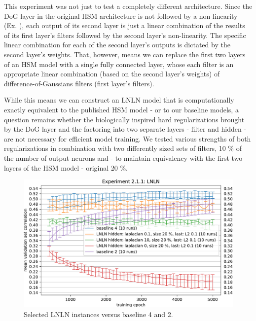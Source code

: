 This experiment was not just to test a completely different architecture. Since the DoG layer in the original HSM architecture is not followed by a non-linearity (Ex. ), each output of its second layer is just a linear combination of the results of its first layer’s filters followed by the second layer’s non-linearity. The specific linear combination for each of the second layer’s outputs is dictated by the second layer’s weights. That, however, means we can replace the first two layers of an HSM model with a single fully connected layer, whose each filter is an appropriate linear combination (based on the second layer’s weights) of difference-of-Gaussians filters (first layer’s filters). 

While this means we can construct an LNLN model that is computationally exactly equivalent to the published HSM model - or to our baseline models, a question remains whether the biologically inspired hard regularizations brought by the DoG layer and the factoring into two separate layers - filter and hidden - are not necessary for efficient model training. We tested various strengths of both regularizations in combination with two differently sized sets of filters, 10 \% of the number of output neurons and - to maintain equivalency with the first two layers of the HSM model - original 20 \%.

\begin{figure}[H]
    \centering
    \includegraphics[width=1\textwidth]{../figures/05_2_1_1}
    \caption[Experiment 2.1.1]{Selected LNLN instances versus baseline 4 and 2.}
    \label{fig:5.2.1.1}
\end{figure}

